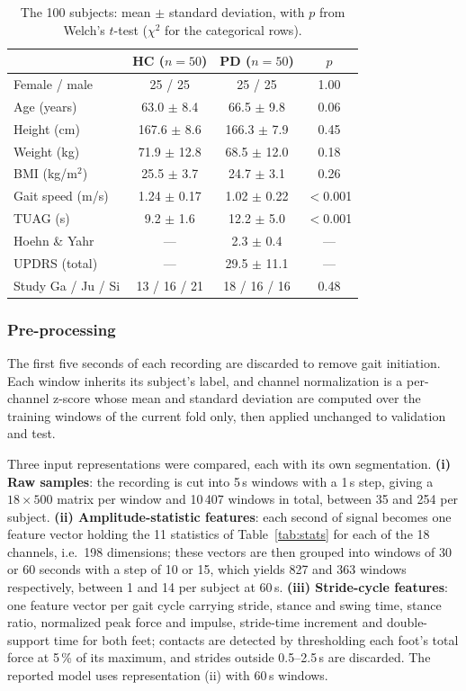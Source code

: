 \begin{table}[t]
  \centering
  \caption{The 100 subjects: mean $\pm$ standard deviation, with $p$ from
  Welch's $t$-test ($\chi^2$ for the categorical rows).}
  \label{tab:cohort}
  \small
  \setlength{\tabcolsep}{3.4pt}
  \begin{tabular}{lccc}
    \toprule
     & HC ($n{=}50$) & PD ($n{=}50$) & $p$ \\
    \midrule
    Female / male       & 25 / 25         & 25 / 25         & 1.00 \\
    Age (years)         & 63.0 $\pm$ 8.4  & 66.5 $\pm$ 9.8  & 0.06 \\
    Height (cm)         & 167.6 $\pm$ 8.6 & 166.3 $\pm$ 7.9 & 0.45 \\
    Weight (kg)         & 71.9 $\pm$ 12.8 & 68.5 $\pm$ 12.0 & 0.18 \\
    BMI (kg/m$^2$)      & 25.5 $\pm$ 3.7  & 24.7 $\pm$ 3.1  & 0.26 \\
    Gait speed (m/s)    & 1.24 $\pm$ 0.17 & 1.02 $\pm$ 0.22 & $<$0.001 \\
    TUAG (s)            & 9.2 $\pm$ 1.6   & 12.2 $\pm$ 5.0  & $<$0.001 \\
    Hoehn \& Yahr       & ---             & 2.3 $\pm$ 0.4   & --- \\
    UPDRS (total)       & ---             & 29.5 $\pm$ 11.1 & --- \\
    Study Ga / Ju / Si  & 13 / 16 / 21    & 18 / 16 / 16    & 0.48 \\
    \bottomrule
  \end{tabular}
\end{table}

\subsubsection{Pre-processing}
The first five seconds of each recording are discarded to remove gait
initiation. Each window inherits its subject's label, and channel normalization
is a per-channel z-score whose mean and standard deviation are computed over
the training windows of the current fold only, then applied unchanged to
validation and test.

Three input representations were compared, each with its own segmentation.
\textbf{(i) Raw samples}: the recording is cut into 5\,s windows with a 1\,s
step, giving a $18 \times 500$ matrix per window and 10\,407 windows in total,
between 35 and 254 per subject. \textbf{(ii) Amplitude-statistic features}: each
second of signal becomes one feature vector holding the 11 statistics of
Table~\ref{tab:stats} for each of the 18 channels, i.e.\ 198 dimensions; these
vectors are then grouped into windows of 30 or 60 seconds with a step of 10 or 15,
which yields 827 and 363 windows respectively, between 1 and 14 per subject at
60\,s. \textbf{(iii) Stride-cycle features}: one feature vector per gait cycle carrying
stride, stance and swing time, stance ratio, normalized peak force and impulse,
stride-time increment and double-support time for both feet; contacts are
detected by thresholding each foot's total force at 5\,\% of its maximum, and
strides outside 0.5--2.5\,s are discarded. The reported model uses
representation (ii) with 60\,s windows.

